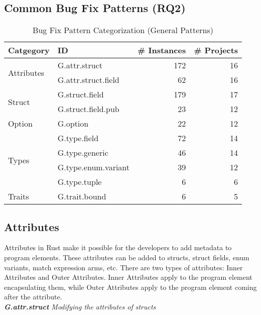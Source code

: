 \subsection{\label{sec:common_patterns}Common Bug Fix Patterns (RQ2)}



\begin{table}[]

\begin{tabular}{l|l|r|r}
\textbf{Catgegory} & \textbf{ID} & \textbf{\# Instances} & \textbf{\# Projects} \\
\hline
\multirow{2}{*}{Attributes} & G.attr.struct & 172 & 16                                  \\
& G.attr.struct.field & 62 & 16                     \\\cline{1-4}
\multirow{2}{*}{Struct} & G.struct.field  & 179 & 17\\
& G.struct.field.pub & 23 & 12   
\\\cline{1-4}
Option & G.option & 22 & 12                    \\\cline{1-4}
\multirow{4}{*}{Types} & G.type.field  & 72 & 14 \\
& G.type.generic & 46 & 14\\ & G.type.enum.variant  & 39 & 12 \\
& G.type.tuple & 6 & 6                                         \\\cline{1-4}
\multirow{1}{*}{Traits} & G.trait.bound & 6 & 5 \\ 
\end{tabular}
\caption{\label{table:general}Bug Fix Pattern Categorization (General Patterns)}
\end{table}
    
    

\subsection{Attributes}

Attributes in Rust make it possible for the developers to add metadata to program elements. These attributes can be added to structs, struct fields, enum variants, match expression arms, etc. There are two types of attributes: Inner Attributes and Outer Attributes. Inner Attributes apply to the program element encapsulating them, while Outer Attributes apply to the program element coming after the attribute. \\

\noindent \textit{\label{sec:G.attr.struct}\textbf{G.attr.struct} Modifying the attributes of structs}

